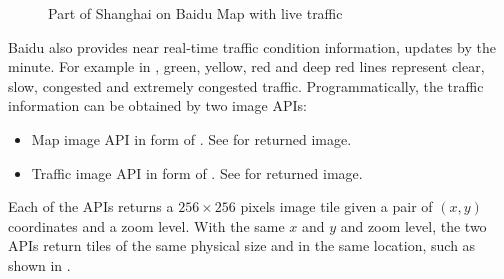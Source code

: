 
\begin{figure}[th]
	\centering
	\caption{Part of Shanghai on Baidu Map with live traffic}
	\label{fig:baidutraffic}
\end{figure}

Baidu also provides near real-time traffic condition information, updates
by the minute. For example in , green, 
yellow, red and deep red lines represent
clear, slow, congested and extremely congested traffic. 
Programmatically, the traffic information can be obtained by 
two image APIs:
\begin{itemize}\itemsep0pt
	\item Map image API in form of 
		. 
		See  for returned image.
	\item Traffic image API in form of 
		. See  for returned image.
\end{itemize}

Each of the APIs returns a $256\times256$ pixels image tile given 
a pair of $(x, y)$ coordinates and a zoom level. 
With the same $x$ and $y$ and zoom level, the two APIs return 
tiles of the same physical size and in the same location, such as shown in
.

